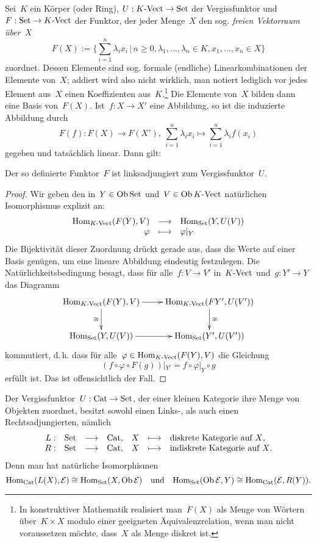 \begin{bsp}Sei~$K$ ein Körper (oder Ring), $U : {K\text{-}\mathrm{Vect}} \to \mathrm{Set}$ der
Vergissfunktor und~$F : \mathrm{Set} \to {K\text{-}\mathrm{Vect}}$ der Funktor, der jeder Menge~$X$
den sog. \emph{freien Vektorraum über~$X$}
\[ F(X) := \Biggl\{ \sum_{i=1}^n \lambda_i x_i \,\Bigg|\,
  n \geq 0, \lambda_1, \ldots, \lambda_n \in K, x_1, \ldots, x_n \in X \Biggr\} \]
zuordnet. Dessen Elemente sind sog. formale (endliche) Linearkombinationen der
Elemente von~$X$; addiert wird also nicht wirklich, man notiert lediglich vor
jedes Element aus~$X$ einen Koeffizienten aus~$K$.\footnote{In konstruktiver
Mathematik realisiert man~$F(X)$ als Menge von Wörtern über~$K \times X$ modulo
einer geeigneten Äquivalenzrelation, wenn man nicht voraussetzen möchte,
dass~$X$ als Menge diskret ist.} Die Elemente von~$X$ bilden dann eine Basis
von~$F(X)$.
Ist~$f : X \to X'$ eine Abbildung, so ist die induzierte
Abbildung durch
\[ F(f) : F(X) \to F(X'),\ \sum_{i=1}^n \lambda_i x_i \mapsto
  \sum_{i=1}^n \lambda_i f(x_i) \]
gegeben und tatsächlich linear. Dann gilt:
\end{bsp}
\begin{prop}Der so definierte Funktor~$F$ ist
linksadjungiert zum Vergissfunktor~$U$.
\end{prop}
\begin{proof}
Wir geben den in~$Y \in \operatorname{Ob}\mathrm{Set}$ und~$V \in \operatorname{Ob}{K\text{-}\mathrm{Vect}}$ natürlichen
Isomorphismus explizit an:
\[ \begin{array}{@{}rcl@{}}
  \Hom_{\Vect{K}}(F(Y), V) &\longrightarrow& \Hom_\Set(Y, U(V)) \\
  \varphi &\longmapsto& \varphi|_Y
\end{array} \]
Die Bijektivität dieser Zuordnung drückt gerade aus, dass die Werte auf einer
Basis genügen, um eine lineare Abbildung eindeutig festzulegen. Die
Natürlichkeitsbedingung besagt, dass für alle~$f:V \to V'$ in~${K\text{-}\mathrm{Vect}}$ und~$g:Y' \to Y$
das Diagramm
\[ \xymatrix{
  \Hom_{\Vect{K}}(F(Y),V) \ar[r] \ar[d]_\cong & \Hom_{\Vect{K}}(FY',U(V')) \ar[d]^\cong \\
  \Hom_\Set(Y,U(V)) \ar[r] & \Hom_\Set(Y',U(V'))
} \]
kommutiert, d.\,h. dass für alle~$\varphi \in \mathrm{Hom}_{{K\text{-}\mathrm{Vect}}}(F(Y),V)$ die Gleichung
\[
  (f \circ \varphi \circ F(g))|_{Y'} = f \circ \varphi|_Y \circ g
\]
erfüllt ist. Das ist offensichtlich der Fall.
\end{proof}

\begin{bsp}Der Vergissfunktor~$U : \mathrm{Cat} \to \mathrm{Set}$, der einer kleinen Kategorie
ihre Menge von Objekten zuordnet, besitzt sowohl einen Links-, als auch einen
Rechtsadjungierten, nämlich
\[ \begin{array}{@{}rrclrcl@{}}
  L : & \Set &\longrightarrow& \Cat, & X &\longmapsto& \text{diskrete Kategorie auf~$X$,} \\
  R : & \Set &\longrightarrow& \Cat, & X &\longmapsto& \text{indiskrete Kategorie auf~$X$.}
\end{array} \]
Denn man hat natürliche Isomorphismen
\[ \mathrm{Hom}_{\mathrm{Cat}}(L(X), \mathcal{E}) \cong \mathrm{Hom}_{\mathrm{Set}}(X, \operatorname{Ob}\mathcal{E})
  \quad\text{und}\quad
  \mathrm{Hom}_{\mathrm{Set}}(\operatorname{Ob}\mathcal{E}, Y) \cong \mathrm{Hom}_{\mathrm{Cat}}(\mathcal{E}, R(Y)). \]
\end{bsp}

